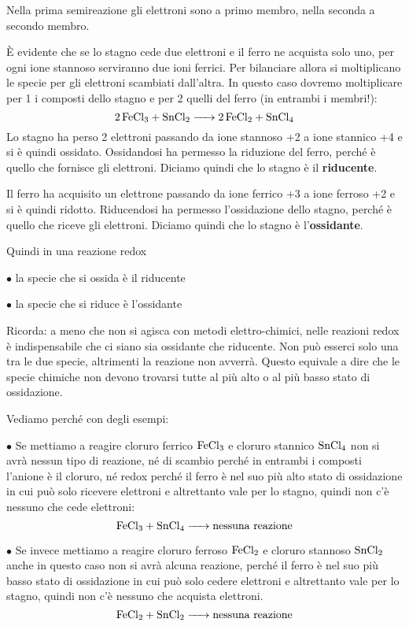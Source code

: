 Nella prima semireazione gli elettroni sono a primo membro, nella seconda a secondo membro.

È evidente che se lo stagno cede due elettroni e il ferro ne acquista solo uno, per ogni ione stannoso serviranno due ioni ferrici.
Per bilanciare allora si moltiplicano le specie per gli elettroni scambiati dall'altra.
In questo caso dovremo moltiplicare per 1 i composti dello stagno e per 2 quelli del ferro (in entrambi i membri!):
$$\ce{2 FeCl_3 + SnCl_2 -> 2 FeCl_2 + SnCl_4}$$
Lo stagno ha perso 2 elettroni passando da ione stannoso +2 a ione stannico +4 e si è quindi ossidato. Ossidandosi ha permesso la riduzione del ferro, perché è quello che fornisce gli elettroni. Diciamo quindi che lo stagno è il \textbf{riducente}.

Il ferro ha acquisito un elettrone passando da ione ferrico +3 a ione ferroso +2 e si è quindi ridotto. Riducendosi ha permesso l'ossidazione dello stagno, perché è quello che riceve gli elettroni. Diciamo quindi che lo stagno è l'\textbf{ossidante}.

\vspace{0.2cm}Quindi in una reazione redox

\vspace{0.2cm}$\bullet$ la specie che si ossida è il riducente

\vspace{0.2cm}$\bullet$ la specie che si riduce è l'ossidante

\vspace{0.2cm}Ricorda: a meno che non si agisca con metodi elettro-chimici, nelle reazioni redox è indispensabile che ci siano sia ossidante che riducente. Non può esserci solo una tra le due specie, altrimenti la reazione non avverrà. Questo equivale a dire che le specie chimiche non devono trovarsi tutte al più alto o al più basso stato di ossidazione.

Vediamo perché con degli esempi:

\vspace{0.2cm}$\bullet$ Se mettiamo a reagire cloruro ferrico $\rm FeCl_3$ e cloruro stannico $\rm SnCl_4$ non si avrà nessun tipo di reazione, né di scambio perché in entrambi i composti l'anione è il cloruro, né redox perché il ferro è nel suo più alto stato di ossidazione in cui può solo ricevere elettroni e altrettanto vale per lo stagno, quindi non c'è nessuno che cede elettroni:
$$\ce{FeCl_3 +  SnCl_4 ->}\text{nessuna reazione}$$

\vspace{0.2cm}$\bullet$ Se invece mettiamo a reagire cloruro ferroso $\rm FeCl_2$ e cloruro stannoso $\rm SnCl_2$ anche in questo caso non si avrà alcuna reazione, perché il ferro è nel suo più basso stato di ossidazione in cui può solo cedere elettroni e altrettanto vale per lo stagno, quindi non c'è nessuno che acquista elettroni.
$$\ce{FeCl_2 + SnCl_2 ->}\text{nessuna reazione}$$
